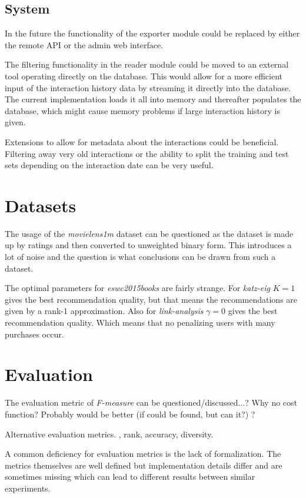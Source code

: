\subsection{System}

In the future the functionality of the exporter module could be replaced by either the remote API or the admin web interface.

The filtering functionality in the reader module could be moved to an external tool operating directly on the database. This would allow for a more efficient input of the interaction history data by streaming it directly into the database. The current implementation loads it all into memory and thereafter populates the database, which might cause memory problems if large interaction history is given.

Extensions to allow for metadata about the interactions could be beneficial. Filtering away very old interactions or the ability to split the training and test sets depending on the interaction date can be very useful.


\section{Datasets}

The usage of the \textit{movielens1m} dataset can be questioned as the dataset is made up by ratings and then converted to unweighted binary form. This introduces a lot of noise and the question is what conclusions can be drawn from such a dataset.

The optimal parameters for \textit{eswc2015books} are fairly strange. For \textit{katz-eig} $K = 1$ gives the best recommendation quality, but that means the recommendations are given by a rank-1 approximation. Also for \textit{link-analysis} $\gamma = 0$ gives the best recommendation quality. Which means that no penalizing users with many purchases occur.


\section{Evaluation}

The evaluation metric of \textit{F-measure} can be questioned/discussed...? Why no cost function? Probably would be better (if could be found, but can it?) ?

Alternative evaluation metrics. \rmse, rank, accuracy, diversity.

A common deficiency for evaluation metrics is the lack of formalization. The metrics themselves are well defined but implementation details differ and are sometimes missing which can lead to different results between similar experiments.


